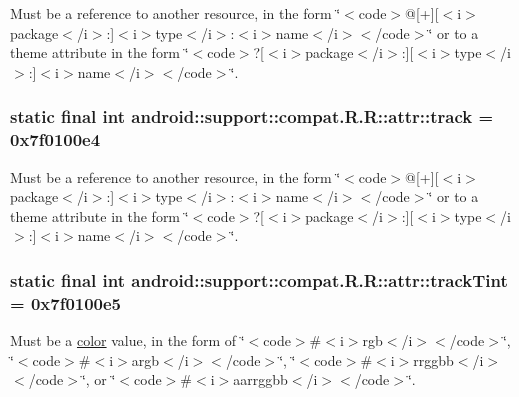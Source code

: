 Must be a reference to another resource, in the form \char`\"{}$<$code$>$@\mbox{[}+\mbox{]}\mbox{[}$<$i$>$package$<$/i$>$:\mbox{]}$<$i$>$type$<$/i$>$:$<$i$>$name$<$/i$>$$<$/code$>$\char`\"{} or to a theme attribute in the form \char`\"{}$<$code$>$?\mbox{[}$<$i$>$package$<$/i$>$:\mbox{]}\mbox{[}$<$i$>$type$<$/i$>$:\mbox{]}$<$i$>$name$<$/i$>$$<$/code$>$\char`\"{}. \hypertarget{classandroid_1_1support_1_1compat_1_1_r_1_1attr_a096cf67f573b4f26382cd2896df702f}{
\subsubsection[{track}]{\setlength{\rightskip}{0pt plus 5cm}static final int android::support::compat.R.R::attr::track = 0x7f0100e4}}
\label{classandroid_1_1support_1_1compat_1_1_r_1_1attr_a096cf67f573b4f26382cd2896df702f}


Must be a reference to another resource, in the form \char`\"{}$<$code$>$@\mbox{[}+\mbox{]}\mbox{[}$<$i$>$package$<$/i$>$:\mbox{]}$<$i$>$type$<$/i$>$:$<$i$>$name$<$/i$>$$<$/code$>$\char`\"{} or to a theme attribute in the form \char`\"{}$<$code$>$?\mbox{[}$<$i$>$package$<$/i$>$:\mbox{]}\mbox{[}$<$i$>$type$<$/i$>$:\mbox{]}$<$i$>$name$<$/i$>$$<$/code$>$\char`\"{}. \hypertarget{classandroid_1_1support_1_1compat_1_1_r_1_1attr_ad0640d575f16dec548f0d0b0456488b}{
\subsubsection[{trackTint}]{\setlength{\rightskip}{0pt plus 5cm}static final int android::support::compat.R.R::attr::trackTint = 0x7f0100e5}}
\label{classandroid_1_1support_1_1compat_1_1_r_1_1attr_ad0640d575f16dec548f0d0b0456488b}


Must be a \hyperlink{classandroid_1_1support_1_1compat_1_1_r_1_1color}{color} value, in the form of \char`\"{}$<$code$>$\#$<$i$>$rgb$<$/i$>$$<$/code$>$\char`\"{}, \char`\"{}$<$code$>$\#$<$i$>$argb$<$/i$>$$<$/code$>$\char`\"{}, \char`\"{}$<$code$>$\#$<$i$>$rrggbb$<$/i$>$$<$/code$>$\char`\"{}, or \char`\"{}$<$code$>$\#$<$i$>$aarrggbb$<$/i$>$$<$/code$>$\char`\"{}. 

